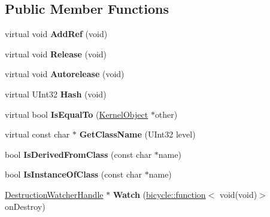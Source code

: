 \subsection*{Public Member Functions}
\begin{DoxyCompactItemize}
\item 
\mbox{\label{class_kernel_object_a3acaa882f6fd48aa73479c1d85adc01b}} 
virtual void {\bfseries Add\+Ref} (void)
\item 
\mbox{\label{class_kernel_object_a1ab51c4efab74fe7031d20c2977d3007}} 
virtual void {\bfseries Release} (void)
\item 
\mbox{\label{class_kernel_object_a7e90f015b06f04d2bf24a8d0c1f2d01b}} 
virtual void {\bfseries Autorelease} (void)
\item 
\mbox{\label{class_kernel_object_a1453eb2f9d706cca362b59bcbb67c89e}} 
virtual U\+Int32 {\bfseries Hash} (void)
\item 
\mbox{\label{class_kernel_object_ab44f875a49feae5ab2c7a6d34232be34}} 
virtual bool {\bfseries Is\+Equal\+To} (\hyperlink{class_kernel_object}{Kernel\+Object} $\ast$other)
\item 
\mbox{\label{class_kernel_object_a510d90ac2bb40fa5d6356d62a688bfc1}} 
virtual const char $\ast$ {\bfseries Get\+Class\+Name} (U\+Int32 level)
\item 
\mbox{\label{class_kernel_object_aebe126d96e0db3f95d095794d0af344c}} 
bool {\bfseries Is\+Derived\+From\+Class} (const char $\ast$name)
\item 
\mbox{\label{class_kernel_object_a60b69686097868fc83081f35b7041a5f}} 
bool {\bfseries Is\+Instance\+Of\+Class} (const char $\ast$name)
\item 
\mbox{\label{class_kernel_object_a230cb13d1dc6c6535387d9efe8b23c17}} 
\hyperlink{class_kernel_object_1_1_destruction_watcher_handle}{Destruction\+Watcher\+Handle} $\ast$ {\bfseries Watch} (\hyperlink{classbicycle_1_1function}{bicycle\+::function}$<$ void(void)$>$ on\+Destroy)
\end{DoxyCompactItemize}
